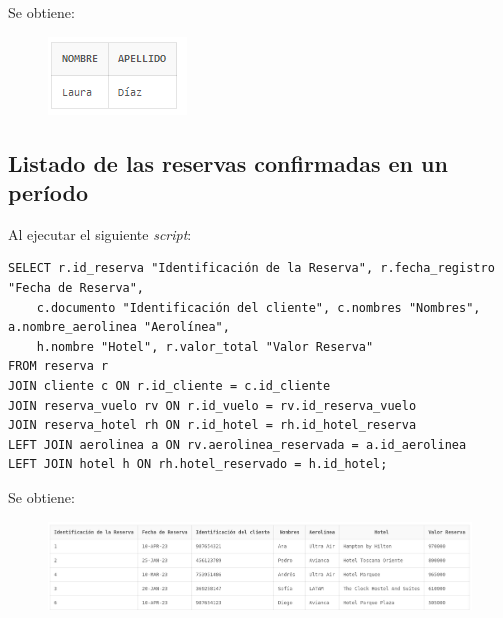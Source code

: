 \documentclass{article}
\begin{document}
Se obtiene:

\begin{figure}[h]
    \centering
    \includegraphics[width=1\linewidth]{img/Consulta_1.png}
\end{figure}

\newpage

\subsection{Listado de las reservas confirmadas en un período}
Al ejecutar el siguiente \textit{script}:
\begin{lstlisting}
SELECT r.id_reserva "Identificación de la Reserva", r.fecha_registro "Fecha de Reserva",
    c.documento "Identificación del cliente", c.nombres "Nombres", a.nombre_aerolinea "Aerolínea",
    h.nombre "Hotel", r.valor_total "Valor Reserva"
FROM reserva r
JOIN cliente c ON r.id_cliente = c.id_cliente
JOIN reserva_vuelo rv ON r.id_vuelo = rv.id_reserva_vuelo
JOIN reserva_hotel rh ON r.id_hotel = rh.id_hotel_reserva
LEFT JOIN aerolinea a ON rv.aerolinea_reservada = a.id_aerolinea
LEFT JOIN hotel h ON rh.hotel_reservado = h.id_hotel;
\end{lstlisting}

Se obtiene:

\begin{figure}[h]
    \centering
    \includegraphics[width=1\linewidth]{img/Consulta_2.png}
\end{figure}
\end{document}
